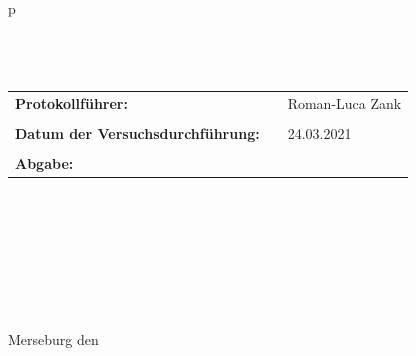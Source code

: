 \begin{center}
\begin{tabular}{p{\textwidth}}
\\ \\ \\ \\

\begin{center}
\begin{tabular}{lll}
\large{\textbf{Protokollführer:}} & & \large{Roman-Luca Zank}\\
&&\\
\large{\textbf{Datum der Versuchsdurchführung:}}&& \large{24.03.2021}\\
&&\\
\large{\textbf{Abgabe:}}&& \large{\todayDE}
\end{tabular}
\end{center}

\\ \\ \\ \\ \\ \\ \\
\large{Merseburg den \todayDE}

\end{tabular}
\end{center}
